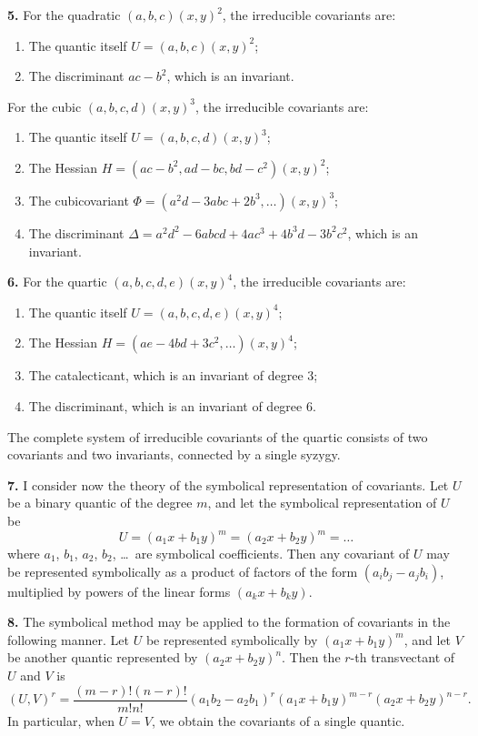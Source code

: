 \documentclass[12pt,a4paper]{article}
\begin{document}
\textbf{5.} For the quadratic $(a, b, c)(x, y)^2$, the irreducible covariants are:
\begin{enumerate}
\item The quantic itself $U = (a, b, c)(x, y)^2$;
\item The discriminant $ac - b^2$, which is an invariant.
\end{enumerate}

\newpage
\setcounter{page}{248}

For the cubic $(a, b, c, d)(x, y)^3$, the irreducible covariants are:
\begin{enumerate}
\item The quantic itself $U = (a, b, c, d)(x, y)^3$;
\item The Hessian $H = (ac-b^2, ad-bc, bd-c^2)(x, y)^2$;
\item The cubicovariant $\Phi = (a^2d - 3abc + 2b^3, \ldots)(x, y)^3$;
\item The discriminant $\Delta = a^2d^2 - 6abcd + 4ac^3 + 4b^3d - 3b^2c^2$, which is an invariant.
\end{enumerate}

\textbf{6.} For the quartic $(a, b, c, d, e)(x, y)^4$, the irreducible covariants are:
\begin{enumerate}
\item The quantic itself $U = (a, b, c, d, e)(x, y)^4$;
\item The Hessian $H = (ae - 4bd + 3c^2, \ldots)(x, y)^4$;
\item The catalecticant, which is an invariant of degree 3;
\item The discriminant, which is an invariant of degree 6.
\end{enumerate}
The complete system of irreducible covariants of the quartic consists of two covariants and two invariants, connected by a single syzygy.

\newpage
\setcounter{page}{249}

\textbf{7.} I consider now the theory of the symbolical representation of covariants. Let $U$ be a binary quantic of the degree $m$, and let the symbolical representation of $U$ be
\[
U = (a_1 x + b_1 y)^m = (a_2 x + b_2 y)^m = \ldots
\]
where $a_1$, $b_1$, $a_2$, $b_2$, \ldots\ are symbolical coefficients. Then any covariant of $U$ may be represented symbolically as a product of factors of the form $(a_i b_j - a_j b_i)$, multiplied by powers of the linear forms $(a_k x + b_k y)$.

\textbf{8.} The symbolical method may be applied to the formation of covariants in the following manner. Let $U$ be represented symbolically by $(a_1 x + b_1 y)^m$, and let $V$ be another quantic represented by $(a_2 x + b_2 y)^n$. Then the $r$-th transvectant of $U$ and $V$ is
\[
(U, V)^r = \frac{(m-r)!(n-r)!}{m!n!} (a_1 b_2 - a_2 b_1)^r (a_1 x + b_1 y)^{m-r} (a_2 x + b_2 y)^{n-r}.
\]
In particular, when $U = V$, we obtain the covariants of a single quantic.
\end{document}

